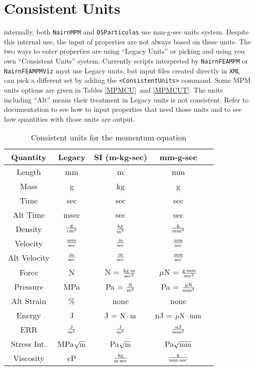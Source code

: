 \documentclass[11pt]{article}
\begin{document}
\section{Consistent Units}

internally, both {\tt NairnMPM} and {\tt OSParticulas} use mm-g-sec units system. Despite this internal use, the input of properties are not always based on these units. The two ways to enter properties are using ``Legacy Units'' or picking and using you own ``Consistent Units'' system. Currently scripts interpreted by {\tt NairnFEAMPM} or {\tt NairnFEAMPMViz} myst use Legacy units, but input files created directly in {\tt XML} can pick a different set by adding the {\tt <ConsistentUnits>} command. Some MPM units options are given in Tables \ref{MPMCU}\ and \ref{MPMCUT}. The units including ``Alt'' means their treatment in Legacy units is not consistent. Refer to documentation to see how to input properties that need those units and to see how quantities with those units are output.

\begin{table}
\caption{Consistent units for the momentum equation  \label{MPMCU}}
\begin{center}
\renewcommand{\arraystretch}{1.3}
\begin{tabular}{||c||c||c||c|c||}
\hline
Quantity & Legacy & SI (m-kg-sec) & mm-g-sec \\
\hline
Length & mm & m & mm  \\
Mass & g & kg & g  \\
Time & sec & sec & sec  \\
Alt Time & msec & sec & sec  \\
Density & $\rm g\over cm^3$ & $\rm kg\over m^3$ & $\rm g\over mm^3$  \\
Velocity & $\rm mm\over sec$& $\rm m\over sec$ & $\rm mm\over sec$  \\
Alt Velocity & $\rm m\over sec$& $\rm m\over sec$ & $\rm mm\over sec$  \\
Force & N & N = $\rm kg\cdot m\over sec^2$  & $\mu$N = $\rm g \cdot mm\over sec^2$   \\
Pressure & MPa & Pa = $\rm N\over m^2$ & Pa = $\mu \rm N\over mm^2$  \\
Alt Strain & \% & none & none  \\
Energy & J & J = $\rm N\cdot m$  & nJ = $\mu \rm N \cdot mm$  \\
ERR & $\rm J \over m^2$ & $\rm J \over m^2$ & $\rm nJ\over mm^2$  \\
Stress Int. & MPa$\sqrt{\rm m}$ & Pa$\sqrt{\rm m}$ & Pa$\sqrt{\rm mm}$  \\
Viscosity & cP & $\rm kg\over m\cdot sec$ & $\rm g\over mm\cdot sec$  \\
\hline
\end{tabular}
\end{center}
\label{units}
\end{table}
\end{document}
